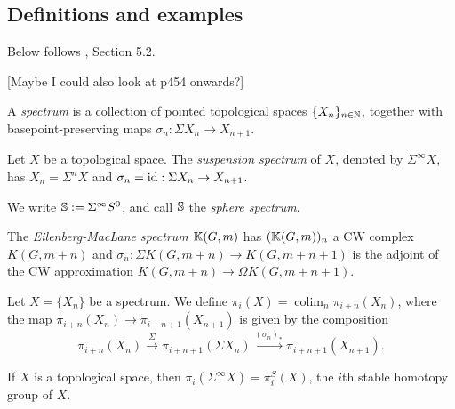 \documentclass{MetricNotes2023}
\def\bb{\ensuremath\mathbb}
\def\nat{\ensuremath\mathbb{N}}
\def\id{\ensuremath\text{id}}
\DeclareMathOperator{\colim}{colim}
\begin{document}
\subsection{Definitions and examples}

Below follows \autocite{hatcher5}, Section 
5.2.

[Maybe I could also look at \autocite{hatcher} p454 onwards?]

\begin{definition}
A \textit{spectrum} is a collection of pointed topological spaces \(\{X_n\}_{n\in \nat}\), together with basepoint-preserving maps \(\sigma_n : \Sigma X_n \to X_{n+1}\).
\end{definition}

\begin{example}
Let \(X\) be a topological space. The \textit{suspension spectrum} of \(X\), denoted by \(\Sigma^\infty X\), has \(X_n=\Sigma^nX\) and \(\sigma_n=\id : \Sigma X_n \to X_{n+1}\).
\end{example}

We write \(\bb{S}:=\Sigma^\infty S^0\), and call \(\bb{S}\) the \textit{sphere spectrum}. 

\begin{example}
The \textit{Eilenberg-MacLane spectrum} \(\bb{K}(G,m)\) has \((\bb{K}(G,m))_n\) a CW complex \(K(G,m+n)\) and \(\sigma_n : \Sigma K(G,m+n)\to K(G,m+n+1)\) is the adjoint of the CW approximation \(K(G, m+n)\to \Omega K(G,m+n+1)\).
\end{example}



\begin{definition}
Let \(X=\{X_n\}\) be a spectrum. We define \(\pi_i(X)=\colim_n \pi_{i+n}(X_n)\), where the map \(\pi_{i+n}(X_n)\to \pi_{i+n+1}(X_{n+1})\) is given by the composition
\[\pi_{i+n}(X_n)\xrightarrow{\Sigma}\pi_{i+n+1}(\Sigma X_n)\xrightarrow{(\sigma_n)_*}\pi_{i+n+1}(X_{n+1}).\]
\end{definition}

\begin{example}
If \(X\) is a topological space, then \(\pi_i(\Sigma^\infty X)=\pi_i^S(X)\), the \(i\)th stable homotopy group of \(X\). 
\end{example}
\end{document}
